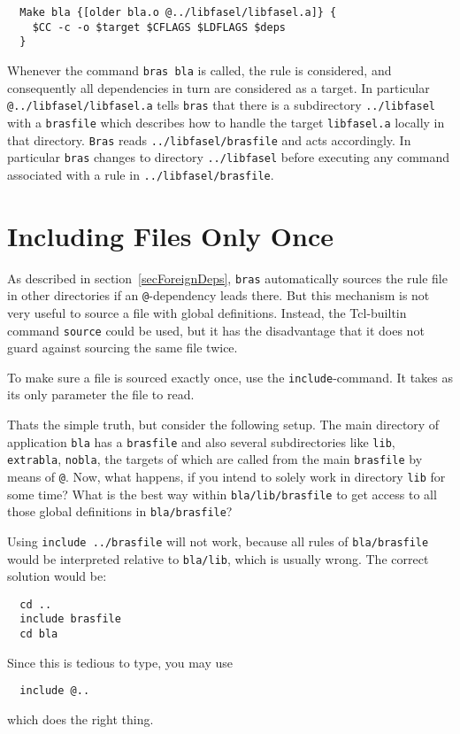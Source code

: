 \documentclass[11pt,bibtotoc,idxtotoc]{scrreprt}
\makeatletter
\newcommand{\bras}{\texttt{bras}}
\newcommand{\Bras}{\texttt{Bras}}
\newcommand{\indextt}[1]{\index{#1@\texttt{#1}}}
\newcommand{\Indextt}[1]{\texttt{#1}\index{#1@\texttt{#1}}}
\makeatother
\begin{document}
\begin{verbatim}
  Make bla {[older bla.o @../libfasel/libfasel.a]} {
    $CC -c -o $target $CFLAGS $LDFLAGS $deps
  }
\end{verbatim}

Whenever the command \texttt{bras bla} is called, the rule is
considered, and consequently all dependencies in turn are considered
as a target. In particular \texttt{@../libfasel/lib\-fasel.a} tells
\bras{} that there is a subdirectory \texttt{../libfasel} with a
\texttt{brasfile} which describes how to handle the target
\texttt{libfasel.a} locally in that directory. \Bras{} reads
\texttt{../libfasel/bras\-file} and acts accordingly. In particular
\bras{} changes to directory \texttt{../libfasel} before executing any
command associated with a rule in \texttt{../libfasel/brasfile}.

\section{Including Files Only Once}
\label{secInclude}

As described in section~\ref{secForeignDeps}, \bras{} automatically
sources the rule file in other directories if an \texttt{@}-dependency
leads there. But this mechanism is not very useful to source a file
with global definitions. Instead, the Tcl-builtin command
\Indextt{source} could be used, but it has the disadvantage that it
does not guard against sourcing the same file twice.

To make sure a file is sourced exactly once, use the
\Indextt{include}-command. It takes as its only parameter the file to
read.

Thats the simple truth, but consider the following setup. The main
directory of application \texttt{bla} has a \texttt{brasfile} and also
several subdirectories like \texttt{lib}, \texttt{extrabla},
\texttt{nobla}, the targets of which are called from the main
\texttt{brasfile} by means of \texttt{@}. Now, what happens, if you
intend to solely work in directory \texttt{lib} for some time?  What
is the best way within \texttt{bla/lib/brasfile} to get access to all
those global definitions in
\texttt{bla/brasfile}?

Using \texttt{include ../brasfile} will not work, because all
rules of \texttt{bla/brasfile} would be interpreted relative to
\texttt{bla/lib}, which is usually wrong. The correct solution would
be:
\begin{verbatim}
  cd ..
  include brasfile
  cd bla
\end{verbatim}
Since this is tedious to type, you may use
\begin{verbatim}
  include @..
\end{verbatim}
\indextt{"@..}
which does the right thing.
\end{document}
